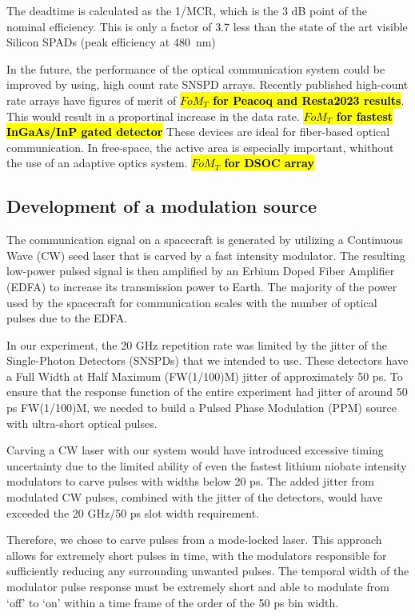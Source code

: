 \documentclass{optica-article}
\begin{document}
The deadtime is calculated as the 1/MCR, which is the 3 dB point of the nominal efficiency. This is only a factor of 3.7 less than the state of the art visible Silicon SPADs (peak efficiency at 480~nm) \cite{Gramuglia2022}

In the future, the performance of the optical communication system could be improved by using, high count rate SNSPD arrays. Recently published high-count rate arrays have figures of merit of \textbf{\hl{$FoM_T$ for Peacoq and Resta2023 results}}. This would result in a proportinal increase in the data rate.
\textbf{\hl{$FoM_T$ for fastest InGaAs/InP gated detector}}
These devices are ideal for fiber-based optical communication. In free-space, the active area is especially important, whithout the use of an adaptive optics system.
\textbf{\hl{$FoM_T$ for DSOC array}}

\hypertarget{development-of-a-modulation-source}{%
\subsection{Development of a modulation source}\label{development-of-a-modulation-source}}

The communication signal on a spacecraft is generated by utilizing a Continuous Wave (CW) seed laser that is carved by a fast intensity modulator. The resulting low-power pulsed signal is then amplified by an Erbium Doped Fiber Amplifier (EDFA) to increase its transmission power to Earth. The majority of the power used by the spacecraft for communication scales with the number of optical pulses due to the EDFA.

In our experiment, the 20 GHz repetition rate was limited by the jitter of the Single-Photon Detectors (SNSPDs) that we intended to use. These detectors have a Full Width at Half Maximum (FW(1/100)M) jitter of approximately 50 ps. To ensure that the response function of the entire experiment had jitter of around 50 ps FW(1/100)M, we needed to build a Pulsed Phase Modulation (PPM) source with ultra-short optical pulses.

Carving a CW laser with our system would have introduced excessive timing uncertainty due to the limited ability of even the fastest lithium niobate intensity modulators to carve pulses with widths below 20 ps. The added jitter from modulated CW pulses, combined with the jitter of the detectors, would have exceeded the 20 GHz/50 ps slot width requirement.

Therefore, we chose to carve pulses from a mode-locked laser. This approach allows for extremely short pulses in time, with the modulators responsible for sufficiently reducing any surrounding unwanted pulses. The temporal width of the modulator pulse response must be extremely short and able to modulate from `off' to `on' within a time frame of the order of the 50 ps bin width.
\end{document}
